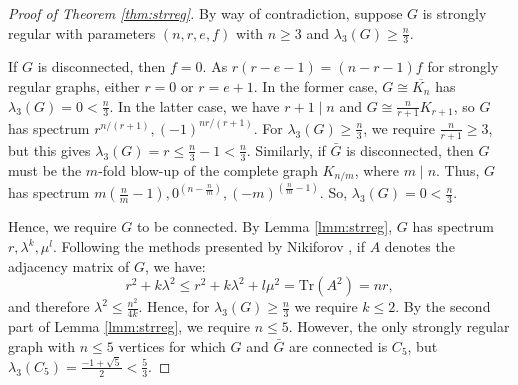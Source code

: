 \documentclass[12pt]{article}
\begin{document}
\begin{proof}[Proof of Theorem \ref{thm:strreg}]
By way of contradiction, suppose $G$ is strongly regular with parameters $(n,r,e,f)$ with $n\ge 3$ and $\lambda_3(G)\ge \frac{n}{3}$. 

If $G$ is disconnected, then $f=0$. As $r(r-e-1)=(n-r-1)f$ for strongly regular graphs, either $r=0$ or $r=e+1$. In the former case, $G\cong \overline{K_n}$ has $\lambda_3(G) = 0< \frac{n}{3}$. In the latter case, we have $r+1 \mid n$ and $G\cong \frac{n}{r+1}K_{r+1}$, so $G$ has spectrum $r^{n/(r+1)},(-1)^{nr/(r+1)}$. For $\lambda_3(G) \ge \frac{n}{3}$, we require $\frac{n}{r+1}\ge 3$, but this gives $\lambda_3(G) = r \le \frac{n}{3}-1 < \frac{n}{3}$.
Similarly, if $\bar{G}$ is disconnected, then $G$ must be the $m$-fold blow-up of the complete graph $K_{n/m}$, where $m\mid n$. Thus, $G$ has spectrum $m(\frac{n}{m}-1),0^{\left(n-\frac{n}{m}\right)},(-m)^{\left(\frac{n}{m}-1\right)}$. So, $\lambda_3(G) = 0 < \frac{n}{3}$. 

Hence, we require $G$ to be connected. By Lemma \ref{lmm:strreg}, $G$ has spectrum $r,\lambda^{k},\mu^{l}$. Following the methods presented by Nikiforov \cite{NikiforovEvals}, if $A$ denotes the adjacency matrix of $G$, we have:
\begin{equation*}
    r^2 +  k\lambda^2 \le  r^2 +  k\lambda^2 + l\mu^2 = \text{Tr}(A^2) =  nr,
\end{equation*}
and therefore $\lambda^2 \le \frac{n^2}{4k}$. Hence, for $\lambda_3(G)\ge \frac{n}{3}$ we require $k\le 2$. By the second part of Lemma \ref{lmm:strreg}, we require $n\le 5$. However, the only strongly regular graph with $n\le 5$ vertices for which $G$ and $\bar{G}$ are connected is $C_5$, but $\lambda_3(C_5) = \frac{-1+\sqrt{5}}{2} < \frac{5}{3}$. 
\end{proof}
\end{document}
